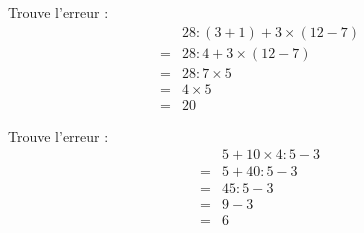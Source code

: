 \begin{multicols}{2}
    Trouve l'erreur :
    \begin{align*}
        &28:(3+1)+3\times (12-7)\\
        =&28:4+3\times (12-7)\\
        =&28:7\times 5\\
        =&4\times 5\\
        =&20
    \end{align*}

    Trouve l'erreur :
    \begin{align*}
        &5+10\times 4:5-3\\
        =&5+40:5-3\\
        =&45:5-3\\
        =&9-3\\
        =&6
    \end{align*}
\end{multicols}